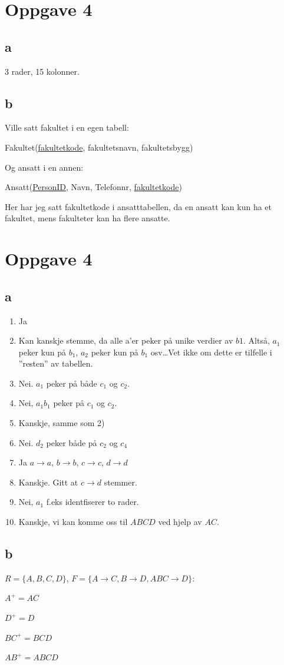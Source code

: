 \documentclass[12pt,a4paper]{article}
\begin{document}
	\section{Oppgave 4}
	\subsection{a}
		3 rader, 15 kolonner.
	
	\subsection{b}
		Ville satt fakultet i en egen tabell:
		
		Fakultet(\underline{fakultetkode}, fakultetsnavn, fakultetsbygg)
		
		Og ansatt i en annen:
		
		Ansatt(\underline{PersonID}, Navn, Telefonnr, \underline{fakultetkode})
		
		Her har jeg satt fakultetkode i ansatttabellen, da en ansatt kan kun ha et fakultet, mens fakulteter kan ha flere ansatte.
		
	\section{Oppgave 4}
	\subsection{a}
		\begin{enumerate}
			\item Ja
			\item Kan kanskje stemme, da alle a'er peker på unike verdier av $b1$. Altså, $a_1$ peker kun på $b_1$, $a_2$ peker kun på $b_1$ osv\dots Vet ikke om dette er tilfelle i ''resten'' av tabellen.
			\item Nei. $a_1$ peker på både $c_1$ og $c_2$.
			\item Nei, $a_1b_1$ peker på $c_1$ og $c_2$.
			\item Kanskje, samme som 2)
			\item Nei. $d_2$ peker både på $c_2$ og $c_4$
			\item Ja $a \rightarrow a$, $b \rightarrow b$, $c \rightarrow c$, $d \rightarrow d$
			\item Kanskje. Gitt at $c \rightarrow d$ stemmer. 
			\item Nei, $a_1$ f.eks identfiserer to rader.
			\item Kanskje, vi kan komme oss til $ABCD$ ved hjelp av $AC$.
		\end{enumerate}
		
	\subsection{b}
		$R = \{A, B, C, D\}$, $F = \{A \rightarrow C, B \rightarrow D, ABC \rightarrow D \}$:
		
		$A^+ = AC$
		
		$D^+ = D$
		
		$BC^+ = BCD$
		
		$AB^+ = ABCD$	
		 
\end{document}
